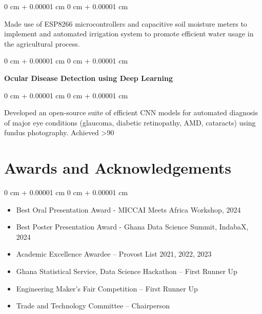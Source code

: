 \documentclass[10pt, letterpaper]{article}
\newenvironment{highlights}{
    \begin{itemize}[
        topsep=0.10 cm,
        parsep=0.10 cm,
        partopsep=0pt,
        itemsep=0pt,
        leftmargin=0 cm + 10pt
    ]
}{
    \end{itemize}
} %
\newenvironment{onecolentry}{
    \begin{adjustwidth}{
        0 cm + 0.00001 cm
    }{
        0 cm + 0.00001 cm
    }
}{
    \end{adjustwidth}
} %
\newenvironment{twocolentry}[2][]{
    \onecolentry
    \def\secondColumn{#2}
    \setcolumnwidth{\fill, 4.5 cm}
    \begin{paracol}{2}
}{
    \switchcolumn \raggedleft \secondColumn
    \end{paracol}
    \endonecolentry
} %
\begin{document}
    \vspace{0.10 cm}
    \begin{onecolentry}
        Made use of ESP8266 microcontrollers and capacitive soil moisture meters to implement and automated irrigation system to promote efficient water usage in the agricultural process.
    \end{onecolentry}

    \vspace{0.2 cm}

    \begin{twocolentry}{
    }
        \textbf{Ocular Disease Detection using Deep Learning}
    \end{twocolentry}

    \vspace{0.10 cm}
    \begin{onecolentry}
        Developed an open-source suite of efficient CNN models for automated diagnosis of major eye conditions (glaucoma, diabetic retinopathy, AMD, cataracts) using fundus photography. Achieved >90%
    \end{onecolentry}

    \section{Awards and Acknowledgements}

    \begin{onecolentry}
        \begin{highlights}
            \item Best Oral Presentation Award - MICCAI Meets Africa Workshop, 2024
            \item Best Poster Presentation Award - Ghana Data Science Summit, IndabaX, 2024
            \item Academic Excellence Awardee – Provost List 2021, 2022, 2023
            \item Ghana Statistical Service, Data Science Hackathon – First Runner Up
            \item Engineering Maker's Fair Competition – First Runner Up
            \item Trade and Technology Committee – Chairperson
        \end{highlights}
    \end{onecolentry}
\end{document}
